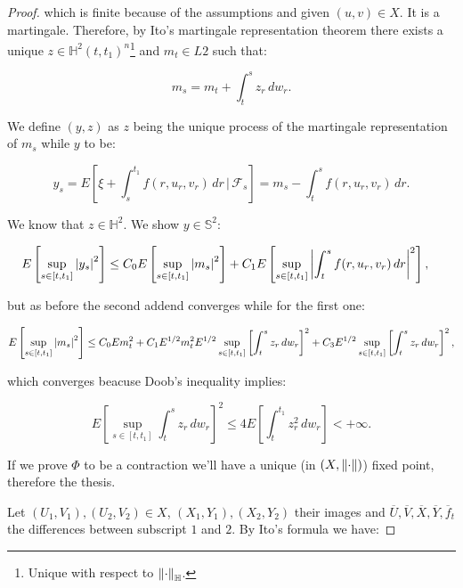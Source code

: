 \begin{theorem}
\begin{proof}
        which is finite because of the assumptions and given $(u,v)\in X$. It is a martingale. Therefore, by 
        Ito's martingale representation theorem there exists a unique $z\in\mathbb{H}^2(t,t_1)^n$\footnote{Unique with respect to $\norm{\cdot}_{\mathbb{H}}$.} and $m_t\in L2$ such that:
        
        \begin{equation}
            m_s = m_t + \int_t^{s} z_r\,dw_r.
        \end{equation}

        We define $(y,z)$ as $z$ being the unique process of the martingale representation of $m_s$ while $y$ to be:

        \begin{equation}
            y_s = E\left[\xi + \int_s^{t_1} f(r,u_r,v_r)\,dr\,|\,\mathcal{F}_s\right] = m_s - \int_t^s f(r,u_r,v_r)\,dr.
        \end{equation}

        We know that $z\in\mathbb{H}^2$. We show $y\in\mathbb{S}^2$:

        \begin{align}
            E\left[\sup_{s\in[t,t_1]}\abs{y_s}^2\right] & \leq C_0E\left[\sup_{s\in[t,t_1]}\abs{m_s}^2\right] + C_1E\left[\sup_{s\in[t,t_1]}\abs{\int_t^s f(r,u_r,v_r)\,dr}^2\right],
        \end{align}

        but as before the second addend converges while for the first one:

        \[E\left[\sup_{s\in[t,t_1]}\abs{m_s}^2\right] \leq C_0 Em_t^2 + C_1E^{1/2}m_t^2E^{1/2}\sup_{s\in[t,t_1]}\left[\int_t^{s}z_r\,dw_r\right]^2+C_3E^{1/2}\sup_{s\in[t,t_1]}\left[\int_t^{s}z_r\,dw_r\right]^2,\]

        which converges beacuse Doob's inequality implies:

        \[E\left[\sup_{s\in[t,t_1]}\int_t^sz_r\,dw_r\right]^2 \leq 4E\left[\int_t^{t_1}z_r^2\,dw_r\right]<+\infty.\]

        If we prove $\Phi$ to be a contraction we'll have a unique (in $(X,\norm{\cdot})$) fixed point, therefore the thesis. 
        
        Let $(U_1,V_1),(U_2,V_2)\in X$, $(X_1,Y_1),(X_2,Y_2)$ their images and $\overline{U},\overline{V},\overline{X},\overline{Y},\overline{f}_t$ the differences between subscript $1$ and $2$. 
        By Ito's formula we have:


\end{proof}
\end{theorem}
